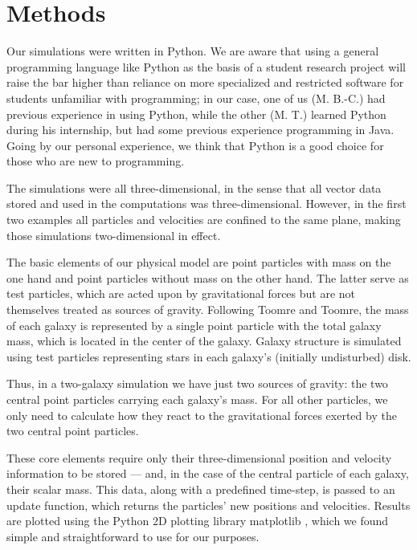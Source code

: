 \documentclass[11pt,twocolumn]{article}
\begin{document}
 \section{Methods} \label{methods}

Our simulations were written in Python. We are aware that using a general programming language like Python as the basis of a student research project will raise the bar higher than reliance on more specialized and restricted software for students unfamiliar with programming; in our case, one of us (M. B.-C.) had previous experience in using Python, while the other (M. T.) learned Python during his internship, but had some previous experience programming in Java. Going by our personal experience, we think that Python is a good choice for those who are new to programming.

The simulations were all three-dimensional, in the sense that all vector data stored and used in the computations was three-dimensional. However, in the first two examples all particles and velocities are confined to the same plane, making those simulations two-dimensional in effect.



The basic elements of our physical model are point particles with mass on the one hand and point particles without mass on the other hand. The latter serve as test particles, which are acted upon by gravitational forces but are not themselves treated as sources of gravity. Following Toomre and Toomre, the mass of each galaxy is represented by a single point particle with the total galaxy mass, which is located in the center of the galaxy. Galaxy structure is simulated using test particles representing stars in each galaxy's (initially undisturbed) disk. 
        
        
Thus, in a two-galaxy simulation we have just two sources of gravity: the two central point particles carrying each galaxy's mass. For all other particles, we only need to calculate how they react to the gravitational forces exerted by the two central point particles. 
 
        
       These core elements require only their three-dimensional position and velocity information to be stored --- and, in the case of the central particle of each galaxy, their scalar mass. This data, along with a predefined time-step, is passed to an update function, which returns the particles' new positions and velocities. Results are plotted using the Python 2D plotting library matplotlib \cite{Hunter:2007}, which we found simple and straightforward to use for our purposes.
%
        
\end{document}
